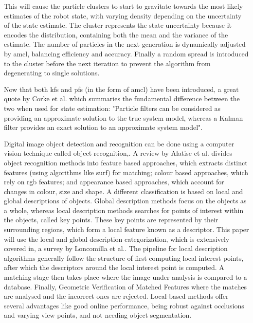 This will cause the particle clusters to start to gravitate towards the most likely estimates of the robot state, with varying density depending on the uncertainty of the state estimate\:\cite{corke_robotics_2023}. 
The cluster represents the state uncertainty because it encodes the distribution, containing both the mean and the variance of the estimate\:\cite{corke_robotics_2023}. 
The number of particles in the next generation is dynamically adjusted by \ac{amcl}, balancing efficiency and accuracy\:\cite{corke_robotics_2023}. 
Finally a random spread is introduced to the cluster before the next iteration to prevent the algorithm from degenerating to single solutions\:\cite{corke_robotics_2023}.

Now that both \acp{kf} and \acp{pf} (in the form of \ac{amcl}) have been introduced, a great quote by Corke et al. which summaries the fundamental difference between the two when used for state estimation: "Particle filters can be considered as providing an approximate solution to the true system model, whereas a Kalman filter provides an exact solution to an approximate system model"\:\cite{corke_robotics_2023}.

Digital image object detection and recognition can be done using a computer vision technique called object recognition\:\cite{alatise_review_2020},\cite{loncomilla_object_2016}. 
A review by Alatise et al. divides object recognition methods into feature based approaches, which extracts distinct features (using algorithms like \ac{surf}) for matching; colour based approaches, which rely on \ac{rgb} features; and appearance based approaches, which account for changes in colour, size and shape\:\cite{alatise_review_2020}. 
A different classification is based on local and global descriptions of objects\:\cite{loncomilla_object_2016}. Global description methods focus on the objects as a whole, whereas local description methods searches for points of interest within the objects, called key points. These key points are represented by their surrounding regions, which form a local feature known as a descriptor\:\cite{loncomilla_object_2016}. 
This paper will use the local and global description categorization, which is extensively covered in\:\cite{loncomilla_object_2016}, a survey by Loncomilla et al.. 
The pipeline for local description algorithms generally follow the structure of first computing local interest points, after which the descriptors around the local interest point is computed\:\cite{loncomilla_object_2016}. A matching stage then takes place where the image under analysis is compared to a database\:\cite{loncomilla_object_2016}. Finally, Geometric Verification of Matched Features where the matches are analysed and the incorrect ones are rejected\:\cite{loncomilla_object_2016}.
Local-based methods offer several advantages like good online performance, being robust against occlusions and varying view points, and not needing object segmentation\:\cite{loncomilla_object_2016}.

